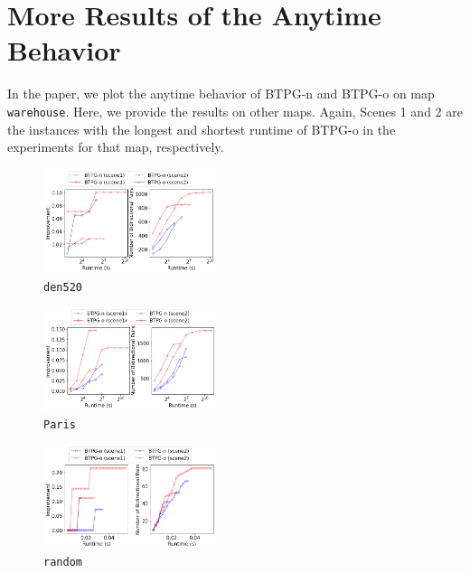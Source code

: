 \documentclass[letterpaper]{article} %
\theoremstyle{definition}
\begin{document}

\newpage
\appendix

\setcounter{figure}{0}
\renewcommand{\thefigure}{A\arabic{figure}}
\setcounter{table}{0}
\renewcommand{\thetable}{A\arabic{table}}



\section{More Results of the Anytime Behavior}
In the paper, we plot the anytime behavior of BTPG-n and BTPG-o on map \texttt{warehouse}. Here, we provide the results on other maps. Again, Scenes 1 and 2 are the instances with the longest and shortest runtime of BTPG-o in the experiments for that map, respectively.


\begin{figure}[h]
    \centering
    \includegraphics[width=0.45\textwidth]{Figs/anytime_den520.png}
    \caption{\texttt{den520}}
\end{figure}
\begin{figure}[h]
    \centering
    \includegraphics[width=0.45\textwidth]{Figs/anytime_paris.png}
    \caption{\texttt{Paris}}
\end{figure}
\begin{figure}[h]
    \centering
    \includegraphics[width=0.45\textwidth]{Figs/anytime_random.png}
    \caption{\texttt{random}}
\end{figure}
\end{document}
